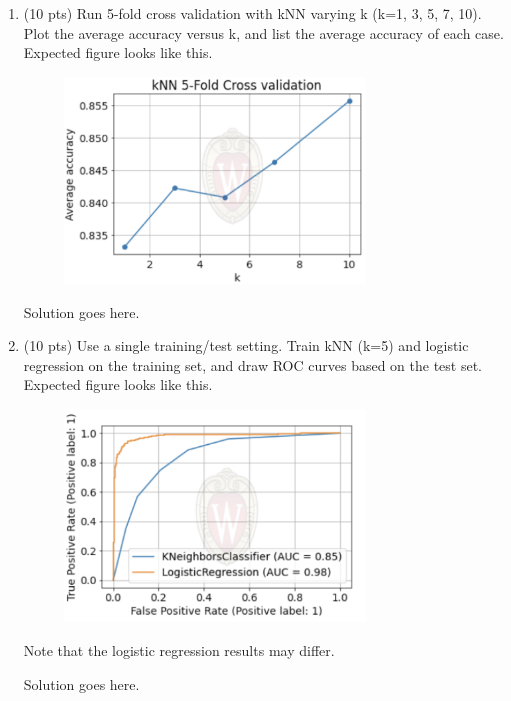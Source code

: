 \documentclass[a4paper]{article}
\theoremstyle{definition}
\newenvironment{soln}{
    \leavevmode\color{blue}\ignorespaces
}{}
\begin{document}
\begin{enumerate}
	\item (10 pts) Run 5-fold cross validation with kNN varying k (k=1, 3, 5, 7, 10). Plot the average accuracy versus k, and list the average accuracy of each case. \\
	      Expected figure looks like this.
	      \begin{figure}[h]
		      \centering
		      \includegraphics[width=8cm]{knn.png}
	      \end{figure}

	      \begin{soln}  Solution goes here. \end{soln}

	\item (10 pts) Use a single training/test setting. Train kNN (k=5) and logistic regression on the training set, and draw ROC curves based on the test set. \\
	      Expected figure looks like this.
	      \begin{figure}[h]
		      \centering
		      \includegraphics[width=8cm]{roc.png}
	      \end{figure}
	      Note that the logistic regression results may differ.

	      \begin{soln}  Solution goes here. \end{soln}

\end{enumerate}

\end{document}
